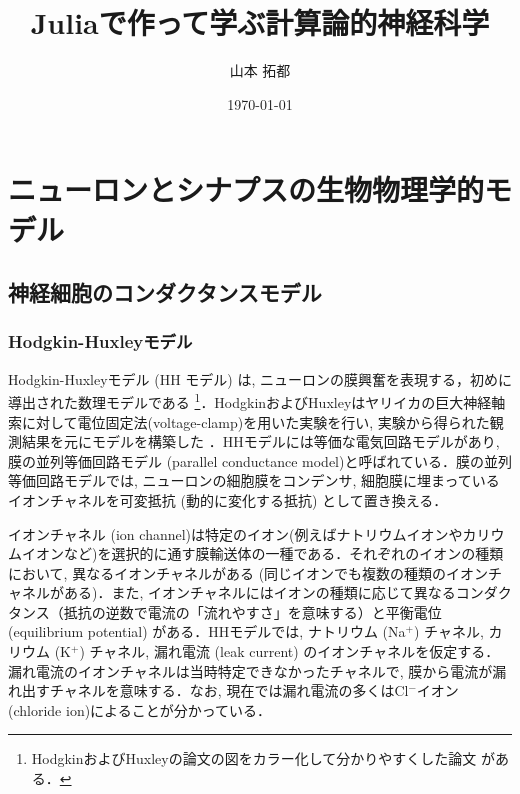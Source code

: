 \documentclass[titlepage]{ltjsbook}
\title{\Huge \textbf{Juliaで作って学ぶ計算論的神経科学}}
\author{\huge 山本 拓都}
\date{\huge \today}
\begin{document}
\setcounter{tocdepth}{2}
\tableofcontents
\clearpage
\chapter{ニューロンとシナプスの生物物理学的モデル}
\section{神経細胞のコンダクタンスモデル}
\subsection{Hodgkin-Huxleyモデル}
Hodgkin-Huxleyモデル (HH モデル) は, ニューロンの膜興奮を表現する，初めに導出された数理モデルである \citep{Hodgkin1952-gy} \footnote{HodgkinおよびHuxleyの論文の図をカラー化して分かりやすくした論文 \citep{Hopper2022-xj} がある．}．HodgkinおよびHuxleyはヤリイカの巨大神経軸索に対して電位固定法(voltage-clamp)を用いた実験を行い, 実験から得られた観測結果を元にモデルを構築した \citep{Schwiening2012-pi}．HHモデルには等価な電気回路モデルがあり, 膜の並列等価回路モデル (parallel conductance model)と呼ばれている．膜の並列等価回路モデルでは, ニューロンの細胞膜をコンデンサ, 細胞膜に埋まっているイオンチャネルを可変抵抗 (動的に変化する抵抗) として置き換える．

イオンチャネル (ion channel)は特定のイオン(例えばナトリウムイオンやカリウムイオンなど)を選択的に通す膜輸送体の一種である．それぞれのイオンの種類において, 異なるイオンチャネルがある (同じイオンでも複数の種類のイオンチャネルがある)．また, イオンチャネルにはイオンの種類に応じて異なるコンダクタンス（抵抗の逆数で電流の「流れやすさ」を意味する）と平衡電位 (equilibrium potential) がある．HHモデルでは, ナトリウム (Na$^{+}$) チャネル, カリウム (K$^{+}$) チャネル, 漏れ電流 (leak current) のイオンチャネルを仮定する．漏れ電流のイオンチャネルは当時特定できなかったチャネルで, 膜から電流が漏れ出すチャネルを意味する．なお, 現在では漏れ電流の多くはCl$^{-}$イオン(chloride ion)によることが分かっている．
\end{document}
